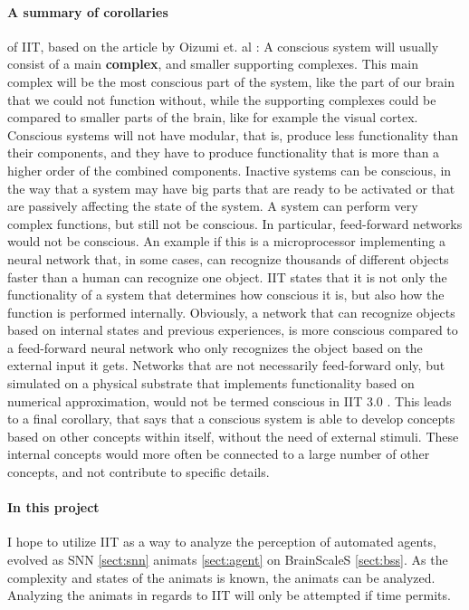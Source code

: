 \paragraph{A summary of corollaries} of IIT, based on the article by Oizumi et. al \cite{oizumi_phenomenology_2014}:
A conscious system will usually consist of a main \textbf{complex}, and smaller supporting complexes.
This main complex will be the most conscious part of the system, like the part of our brain that we could not function without, while the supporting complexes could be compared to smaller parts of the brain, like for example the visual cortex.
Conscious systems will not have modular, that is, produce less functionality than their components, and they have to produce functionality that is more than a higher order of the combined components.
Inactive systems can be conscious, in the way that a system may have big parts that are ready to be activated or that are passively affecting the state of the system.
A system can perform very complex functions, but still not be conscious.
In particular, feed-forward networks would not be conscious.
An example if this is a microprocessor implementing a neural network that, in some cases, can recognize thousands of different objects faster than a human can recognize one object.
IIT states that it is not only the functionality of a system that determines how conscious it is, but also how the function is performed internally.
Obviously, a network that can recognize objects based on internal states and previous experiences, is more conscious compared to a feed-forward neural network who only recognizes the object based on the external input it gets.
Networks that are not necessarily feed-forward only, but simulated on a physical substrate that implements functionality based on numerical approximation, would not be termed conscious in IIT 3.0 \cite{marshall_integrated_2016}.
This leads to a final corollary, that says that a conscious system is able to develop concepts based on other concepts within itself, without the need of external stimuli.
These internal concepts would more often be connected to a large number of other concepts, and not contribute to specific details.

\paragraph{In this project} I hope to utilize IIT as a way to analyze the perception of automated agents, evolved as SNN \vref{sect:snn} animats \vref{sect:agent} on BrainScaleS \vref{sect:bss}.
As the complexity and states of the animats is known, the animats can be analyzed.
Analyzing the animats in regards to IIT will only be attempted if time permits.
